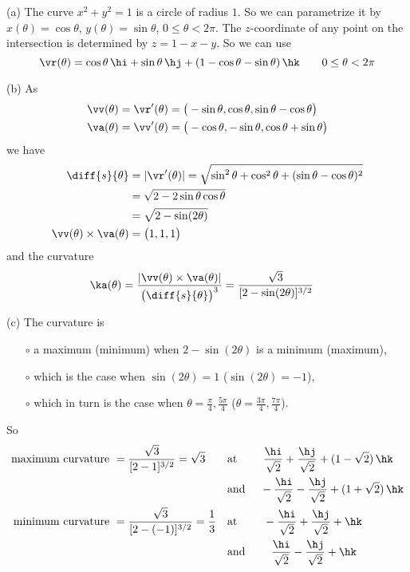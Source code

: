 \begin{solution} (a)
The curve $x^2+y^2=1$ is a circle of radius $1$.
So we can parametrize it by $x(\theta)=\cos\theta$, 
$y(\theta)=\sin\theta$, $0\le\theta<2\pi$. The $z$-coordinate of any point on
the intersection is determined by $z=1-x-y$. So we can use
\begin{equation*}
\vr(\theta) = \cos\theta\,\hi +\sin\theta\,\hj + (1-\cos\theta-\sin\theta)\,\hk
\qquad 0\le\theta<2\pi
\end{equation*}

(b) 
As
\begin{align*}
\vv(\theta)=\vr'(\theta)&=\big(-\sin\theta,\cos\theta,\sin\theta-\cos\theta\big) \\
\va(\theta)=\vv'(\theta)&=\big(-\cos\theta,-\sin\theta,\cos\theta+\sin\theta\big)
\end{align*}
we have
\begin{align*}
\diff{s}{\theta} &= |\vr'(\theta)|
=\sqrt{\sin^2\theta+\cos^2\theta+(\sin\theta-\cos\theta)^2}\\
&=\sqrt{2-2\sin\theta\cos\theta} \\
&=\sqrt{2-\sin(2\theta)} \\
\vv(\theta)\times\va(\theta)&=\big(1,1,1\big)
\end{align*}
and the curvature
\begin{align*}
\ka(\theta) &= \frac{|\vv(\theta)\times\va(\theta)|}{\big(\diff{s}{\theta}\big)^3}
 =\frac{\sqrt{3}}{[2-\sin(2\theta)]^{3/2}}
\end{align*}

(c) The curvature is 
\begin{itemize}\itemsep1pt \parskip0pt  %
\item[$\circ$] 
a maximum (minimum) when $2-\sin(2\theta)$
is a minimum (maximum), 
\item[$\circ$]
which is the case when $\sin(2\theta)=1$
($\sin(2\theta)=-1$), 
\item[$\circ$]
which in turn is the case when $\theta=\frac{\pi}{4},\frac{5\pi}{4}$
($\theta=\frac{3\pi}{4},\frac{7\pi}{4}$). 
\end{itemize}
So
\begin{align*}
\text{maximum curvature }&= \frac{\sqrt{3}}{[2-1]^{3/2}}=\sqrt{3} &&
\text{at }\qquad\frac{\hi}{\sqrt{2}}+\frac{\hj}{\sqrt{2}}+(1-\sqrt{2})\,\hk \\
& &&
\text{and }\quad-\frac{\hi}{\sqrt{2}}-\frac{\hj}{\sqrt{2}}+(1+\sqrt{2})\,\hk \\
\text{minimum curvature }&= \frac{\sqrt{3}}{[2-(-1)]^{3/2}}=\frac{1}{3} &&
\text{at }\qquad-\frac{\hi}{\sqrt{2}}+\frac{\hj}{\sqrt{2}}+\hk \\
& &&
\text{and }\qquad\frac{\hi}{\sqrt{2}}-\frac{\hj}{\sqrt{2}}+\hk 
\end{align*}

\end{solution}


